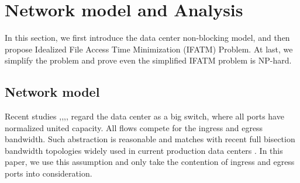 \documentclass{IEEEtran}
\begin{document}
\section{Network model and Analysis} \label{sys_and_model}

In this section, we first introduce the data center non-blocking model, and then propose Idealized File Access Time Minimization (IFATM) Problem.
At last, we simplify the problem and prove even the simplified IFATM problem is NP-hard.


\subsection{Network model}
Recent studies \cite{pFabric},\cite{chowdhury2014efficient},\cite{huang2016sunflow},\cite{chowdhury2015efficient},
regard the data center as a big switch, where all ports have normalized united capacity.
All flows compete for the ingress and egress bandwidth.
Such  abstraction is reasonable and matches with recent full bisection bandwidth topologies widely used in current production data centers \cite{luo2016towards}.
In this paper, we use this assumption and only take the contention of ingress and egress ports into consideration.
\end{document}
